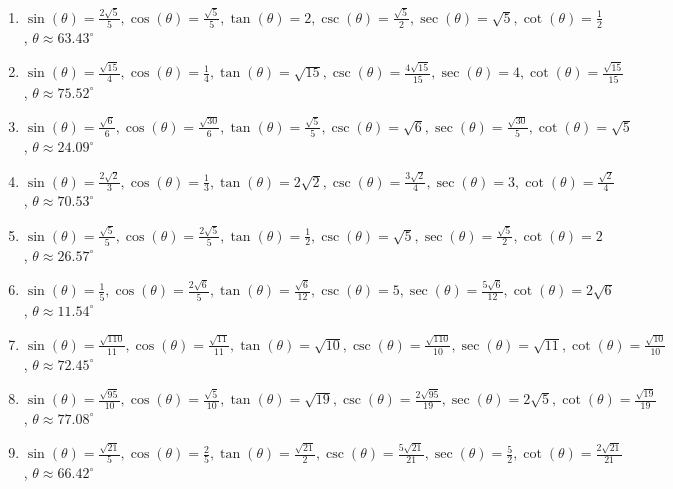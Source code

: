 \documentclass{ximera}
\begin{document}
\begin{enumerate}
\item $\sin(\theta) = \frac{2\sqrt{5}}{5}, \cos(\theta) = \frac{\sqrt{5}}{5}, \tan(\theta) = 2, \csc(\theta) = \frac{\sqrt{5}}{2}, \sec(\theta) = \sqrt{5}, \cot(\theta) = \frac{1}{2}$, $\theta \approx 63.43^{\circ}$

\item  $\sin(\theta) = \frac{\sqrt{15}}{4}, \cos(\theta) = \frac{1}{4}, \tan(\theta) = \sqrt{15}, \csc(\theta) = \frac{4\sqrt{15}}{15}, \sec(\theta) = 4, \cot(\theta) = \frac{\sqrt{15}}{15}$, $\theta \approx 75.52^{\circ}$

\item $\sin(\theta) = \frac{\sqrt{6}}{6}, \cos(\theta) = \frac{\sqrt{30}}{6}, \tan(\theta) = \frac{\sqrt{5}}{5}, \csc(\theta) = \sqrt{6}, \sec(\theta) = \frac{\sqrt{30}}{5}, \cot(\theta) = \sqrt{5}$, $\theta \approx 24.09^{\circ}$

\item $\sin(\theta) = \frac{2\sqrt{2}}{3}, \cos(\theta) = \frac{1}{3}, \tan(\theta) = 2\sqrt{2}, \csc(\theta) = \frac{3\sqrt{2}}{4}, \sec(\theta) = 3, \cot(\theta) = \frac{\sqrt{2}}{4}$, $\theta \approx 70.53^{\circ}$

\item $\sin(\theta) = \frac{\sqrt{5}}{5}, \cos(\theta) = \frac{2\sqrt{5}}{5}, \tan(\theta) = \frac{1}{2}, \csc(\theta) = \sqrt{5}, \sec(\theta) = \frac{\sqrt{5}}{2}, \cot(\theta) = 2$, $\theta \approx 26.57^{\circ}$

\item $\sin(\theta) = \frac{1}{5}, \cos(\theta) = \frac{2\sqrt{6}}{5}, \tan(\theta) = \frac{\sqrt{6}}{12}, \csc(\theta) = 5, \sec(\theta) = \frac{5\sqrt{6}}{12}, \cot(\theta) = 2\sqrt{6}$, $\theta \approx 11.54^{\circ}$

\item $\sin(\theta) = \frac{\sqrt{110}}{11}, \cos(\theta) = \frac{\sqrt{11}}{11}, \tan(\theta) = \sqrt{10}, \csc(\theta) = \frac{\sqrt{110}}{10}, \sec(\theta) = \sqrt{11}, \cot(\theta) = \frac{\sqrt{10}}{10}$, $\theta \approx 72.45^{\circ}$

\item $\sin(\theta) = \frac{\sqrt{95}}{10}, \cos(\theta) = \frac{\sqrt{5}}{10}, \tan(\theta) = \sqrt{19}, \csc(\theta) = \frac{2\sqrt{95}}{19}, \sec(\theta) = 2\sqrt{5}, \cot(\theta) = \frac{\sqrt{19}}{19}$, $\theta \approx 77.08^{\circ}$

\item $\sin(\theta) = \frac{\sqrt{21}}{5}, \cos(\theta) = \frac{2}{5}, \tan(\theta) = \frac{\sqrt{21}}{2}, \csc(\theta) = \frac{5\sqrt{21}}{21}, \sec(\theta) = \frac{5}{2}, \cot(\theta) = \frac{2\sqrt{21}}{21}$, $\theta \approx  66.42^{\circ}$

\setcounter{HW}{\value{enumi}}

\end{enumerate}
\end{document}
